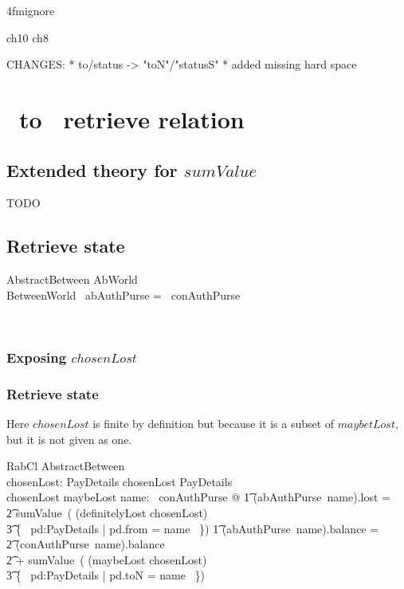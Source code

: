 \ai4fmignore{
\begin{zsection}
  \SECTION ch10 \parents ch8
\end{zsection}
CHANGES:
* to/status -> "toN"/"statusS"
* added missing hard space
}

\chapter{\Abs\ to \Betw\ retrieve relation}\label{ch10}

\section{Extended theory for $sumValue$}

TODO

\section{Retrieve state}\label{ch10.abs.retrive}

\begin{LSDef}
\begin{schema}{AbstractBetween}
  AbWorld
  \\ %
  BetweenWorld
\where %
  \dom~abAuthPurse = \dom~conAuthPurse
\end{schema}~\end{LSDef}

\subsection{Exposing $chosenLost$}

\subsection*{Retrieve state}

Here $chosenLost$ is finite by definition but because it is a subset of $maybetLost$, but it is not given as one.
\begin{LSDef}
\begin{schema}{RabCl}
  AbstractBetween
  \\ %
  chosenLost: \power PayDetails
\where %
  chosenLost \in \finset PayDetails \\
  chosenLost \subseteq maybeLost
  \also %
  \forall name: \dom~conAuthPurse @
  \also %
  \t1 (abAuthPurse~name).lost =
  \\ %
  \t2 sumValue~( (definitelyLost \cup chosenLost)
  \\ %
  \t3 \cap \{~ pd:PayDetails | pd.from = name ~\})
  \also %
  \t1 \land (abAuthPurse~name).balance =
  \\ %
  \t2 (conAuthPurse~name).balance
  \\ %
  \t2 + sumValue~( (maybeLost \setminus chosenLost)
  \\ %
  \t3 \cap \{~ pd:PayDetails | pd.toN = name ~\})
\end{schema}~\end{LSDef}

